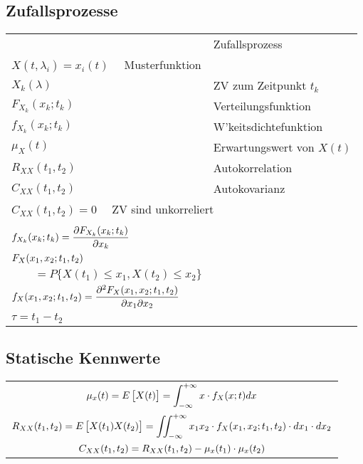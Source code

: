 \documentclass[a4paper]{article}
\begin{document}
\begin{twocolumn}
\section{Zufallsprozesse}
\begin{definition}
\begin{tabularx}{\columnwidth}{XX}
    \begin{tabular}{ll}
      $X(t, \lambda)$ & Zufallsprozess \\ 
      \multicolumn{2}{l}{$X(t,\lambda_i) = x_i(t) \quad$ Musterfunktion} \\
      $X_k(\lambda)$ & ZV zum Zeitpunkt $t_k$ \\
      $F_{X_k}(x_k;t_k)$ & Verteilungsfunktion \\
      $f_{X_k}(x_k;t_k)$ & W'keitsdichtefunktion \\
      $\mu_X(t)$ & Erwartungswert von $X(t)$\\
      $R_{XX}(t_1,t_2)$ & Autokorrelation \\
      $C_{XX}(t_1,t_2)$ & Autokovarianz \\
      \multicolumn{2}{l}{$C_{XX}(t_1,t_2) = 0\quad$ ZV sind unkorreliert}  \\
    \end{tabular}&
    \begin{tabular}{l}
      $\fmm F_{X_k}(x_k;t_k) = P \{ X_k(t_k) \leq x_k \}$ \\
      $\displaystyle f_{X_k}(x_k;t_k) = \frac{\partial F_{X_k}(x_k;t_k)}{\partial x_k}$ \\
      $\displaystyle F_X(x_1, x_2;t_1, t_2) $ \\
      $ \qquad = P \{X(t_1) \leq x_1, X(t_2) \leq x_2 \}$ \\
      $\displaystyle f_X(x_1,x_2;t_1,t_2) = \frac{\partial^2 F_X(x_1,x_2;t_1,t_2)}{\partial x_1
      \partial x_2}$\\ 
      $\tau = t_1 - t_2$
    \end{tabular}
\end{tabularx}
\end{definition} 

\subsection{Statische Kennwerte}

\begin{tabular}{c}
  $\displaystyle \mu_x(t) = E \left[X(t) \right] = \int_{-\infty}^{+\infty} x \cdot f_X(x;t) dx$ \\
  $\displaystyle R_{XX}(t_1,t_2) = E \left[ X(t_1)X(t_2) \right] = \iint_{-\infty}^{+\infty} x_1 x_2 \cdot
  f_X(x_1,x_2;t_1,t_2) \cdot dx_1 \cdot dx_2$ \\
  $\displaystyle C_{XX}(t_1,t_2) = R_{XX}(t_1, t_2) - \mu_x(t_1) \cdot \mu_x(t_2)$
\end{tabular} 



\end{twocolumn}
\end{document}
